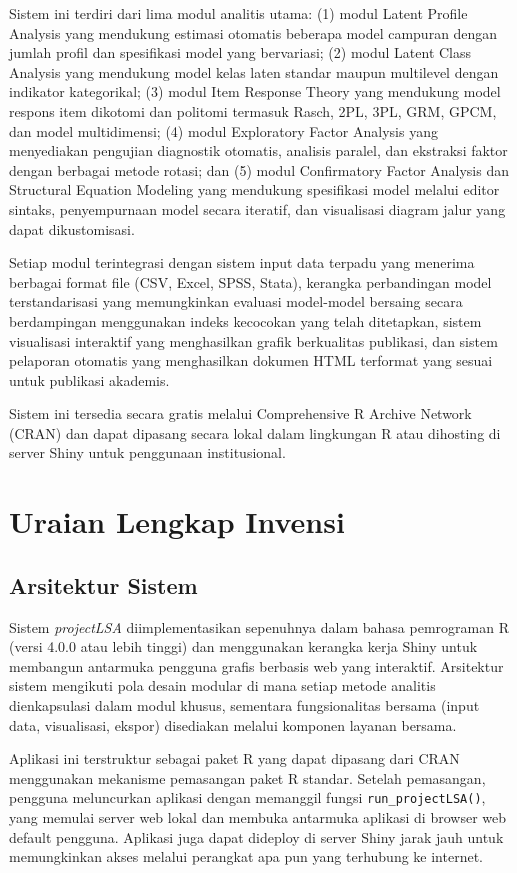 \documentclass[12pt,a4paper]{article}
\begin{document}
Sistem ini terdiri dari lima modul analitis utama: (1) modul Latent Profile Analysis yang mendukung estimasi otomatis beberapa model campuran dengan jumlah profil dan spesifikasi model yang bervariasi; (2) modul Latent Class Analysis yang mendukung model kelas laten standar maupun multilevel dengan indikator kategorikal; (3) modul Item Response Theory yang mendukung model respons item dikotomi dan politomi termasuk Rasch, 2PL, 3PL, GRM, GPCM, dan model multidimensi; (4) modul Exploratory Factor Analysis yang menyediakan pengujian diagnostik otomatis, analisis paralel, dan ekstraksi faktor dengan berbagai metode rotasi; dan (5) modul Confirmatory Factor Analysis dan Structural Equation Modeling yang mendukung spesifikasi model melalui editor sintaks, penyempurnaan model secara iteratif, dan visualisasi diagram jalur yang dapat dikustomisasi.

Setiap modul terintegrasi dengan sistem input data terpadu yang menerima berbagai format file (CSV, Excel, SPSS, Stata), kerangka perbandingan model terstandarisasi yang memungkinkan evaluasi model-model bersaing secara berdampingan menggunakan indeks kecocokan yang telah ditetapkan, sistem visualisasi interaktif yang menghasilkan grafik berkualitas publikasi, dan sistem pelaporan otomatis yang menghasilkan dokumen HTML terformat yang sesuai untuk publikasi akademis.

Sistem ini tersedia secara gratis melalui Comprehensive R Archive Network (CRAN) dan dapat dipasang secara lokal dalam lingkungan R atau dihosting di server Shiny untuk penggunaan institusional.

\section{Uraian Lengkap Invensi}

\subsection{Arsitektur Sistem}

Sistem \textit{projectLSA} diimplementasikan sepenuhnya dalam bahasa pemrograman R (versi 4.0.0 atau lebih tinggi) dan menggunakan kerangka kerja Shiny untuk membangun antarmuka pengguna grafis berbasis web yang interaktif. Arsitektur sistem mengikuti pola desain modular di mana setiap metode analitis dienkapsulasi dalam modul khusus, sementara fungsionalitas bersama (input data, visualisasi, ekspor) disediakan melalui komponen layanan bersama.

Aplikasi ini terstruktur sebagai paket R yang dapat dipasang dari CRAN menggunakan mekanisme pemasangan paket R standar. Setelah pemasangan, pengguna meluncurkan aplikasi dengan memanggil fungsi \texttt{run\_projectLSA()}, yang memulai server web lokal dan membuka antarmuka aplikasi di browser web default pengguna. Aplikasi juga dapat dideploy di server Shiny jarak jauh untuk memungkinkan akses melalui perangkat apa pun yang terhubung ke internet.
\end{document}
